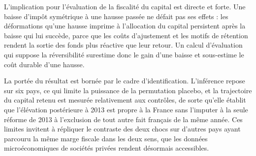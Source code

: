 L'implication pour l'évaluation de la fiscalité du capital est directe et forte. Une baisse d'impôt
symétrique à une hausse passée ne défait pas ses effets : les déformations qu'une hausse imprime à
l'allocation du capital persistent après la baisse qui lui succède, parce que les coûts d'ajustement
et les motifs de rétention rendent la sortie des fonds plus réactive que leur retour. Un calcul
d'évaluation qui suppose la réversibilité surestime donc le gain d'une baisse et sous-estime le coût
durable d'une hausse.

La portée du résultat est bornée par le cadre d'identification. L'inférence repose sur six pays, ce
qui limite la puissance de la permutation placebo, et la trajectoire du capital retenu est mesurée
relativement aux contrôles, de sorte qu'elle établit que l'élévation postérieure à 2013 est propre à
la France sans l'imputer à la seule réforme de 2013 à l'exclusion de tout autre fait français de la
même année. Ces limites invitent à répliquer le contraste des deux chocs sur d'autres pays ayant
parcouru la même marge fiscale dans les deux sens, que les données microéconomiques de sociétés
privées rendent désormais accessibles.
